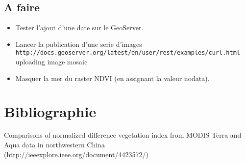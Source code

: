 \documentclass[10pt,a4paper]{article}
\begin{document}
\subsection{A faire}
\begin{itemize}
\item Tester l'ajout d'une date sur le GeoServer.
\item Lancer la publication d'une serie d'images \verb!http://docs.geoserver.org/latest/en/user/rest/examples/curl.html! uploading image mosaic
\item Masquer la mer du raster NDVI (en assignant la valeur nodata).
\end{itemize}
\section{Bibliographie}

Comparisons of normalized difference vegetation index from MODIS Terra and Aqua data in northwestern China (http://ieeexplore.ieee.org/document/4423572/)
\end{document}
